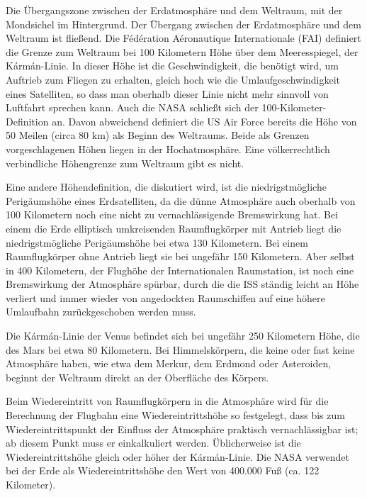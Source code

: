 {Die Übergangszone zwischen der Erdatmosphäre und dem Weltraum, mit der Mondsichel im Hintergrund.
Der Übergang zwischen der Erdatmosphäre und dem Weltraum ist fließend.
Die Fédération Aéronautique Internationale (FAI) definiert die Grenze zum Weltraum bei 100 Kilometern Höhe über dem Meeresspiegel, der Kármán-Linie.
In dieser Höhe ist die Geschwindigkeit, die benötigt wird, um Auftrieb zum Fliegen zu erhalten, gleich hoch wie die Umlaufgeschwindigkeit eines Satelliten, so dass man oberhalb dieser Linie nicht mehr sinnvoll von Luftfahrt sprechen kann.
Auch die NASA schließt sich der 100-Kilometer-Definition an.
Davon abweichend definiert die US Air Force bereits die Höhe von 50 Meilen (circa 80 km) als Beginn des Weltraums.
Beide als Grenzen vorgeschlagenen Höhen liegen in der Hochatmosphäre.
Eine völkerrechtlich verbindliche Höhengrenze zum Weltraum gibt es nicht.

Eine andere Höhendefinition, die diskutiert wird, ist die niedrigstmögliche Perigäumshöhe eines Erdsatelliten, da die dünne Atmosphäre auch oberhalb von 100 Kilometern noch eine nicht zu vernachlässigende Bremswirkung hat.
Bei einem die Erde elliptisch umkreisenden Raumflugkörper mit Antrieb liegt die niedrigstmögliche Perigäumshöhe bei etwa 130 Kilometern.
Bei einem Raumflugkörper ohne Antrieb liegt sie bei ungefähr 150 Kilometern.
Aber selbst in 400 Kilometern, der Flughöhe der Internationalen Raumstation, ist noch eine Bremswirkung der Atmosphäre spürbar, durch die die ISS ständig leicht an Höhe verliert und immer wieder von angedockten Raumschiffen auf eine höhere Umlaufbahn zurückgeschoben werden muss.

Die Kármán-Linie der Venus befindet sich bei ungefähr 250 Kilometern Höhe, die des Mars bei etwa 80 Kilometern.
Bei Himmelskörpern, die keine oder fast keine Atmosphäre haben, wie etwa dem Merkur, dem Erdmond oder Asteroiden, beginnt der Weltraum direkt an der Oberfläche des Körpers.

Beim Wiedereintritt von Raumflugkörpern in die Atmosphäre wird für die Berechnung der Flugbahn eine Wiedereintrittshöhe so festgelegt, dass bis zum Wiedereintrittspunkt der Einfluss der Atmosphäre praktisch vernachlässigbar ist; ab diesem Punkt muss er einkalkuliert werden.
Üblicherweise ist die Wiedereintrittshöhe gleich oder höher der Kármán-Linie.
Die NASA verwendet bei der Erde als Wiedereintrittshöhe den Wert von 400.000 Fuß (ca. 122 Kilometer).

}


